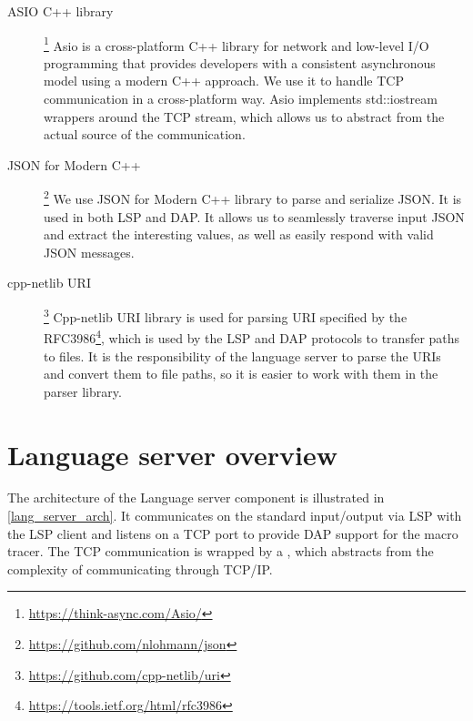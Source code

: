 \begin{description}
	\item [ASIO C++ library]\hspace{-4px}\footnote{\url{https://think-async.com/Asio/}}
Asio is a cross-platform C++ library for network and low-level I/O programming that provides developers with a consistent asynchronous model using a modern C++ approach. We use it to handle TCP communication in a cross-platform way. Asio implements std::iostream wrappers around the TCP stream, which allows us to abstract from the actual source of the communication.

\item [JSON for Modern C++]\hspace{-4px}\footnote{\url{https://github.com/nlohmann/json}} We use JSON for Modern C++ library to parse and serialize JSON. It is used in both LSP and DAP. It allows us to seamlessly traverse input JSON and extract the interesting values, as well as easily respond with valid JSON messages.

\item [cpp-netlib URI]\hspace{-4px}\footnote{\url{https://github.com/cpp-netlib/uri}} Cpp-netlib URI library is used for parsing URI specified by the RFC3986\footnote{\url{https://tools.ietf.org/html/rfc3986}}, which is used by the LSP and DAP protocols to transfer paths to files. It is the responsibility of the language server to parse the URIs and convert them to file paths, so it is easier to work with them in the parser library. 
\end{description}

\section{Language server overview}
The architecture of the Language server component is illustrated in \cref{lang_server_arch}. It communicates on the standard input/output via LSP with the LSP client and listens on a TCP port to provide DAP support for the macro tracer. The TCP communication is wrapped by a , which abstracts from the complexity of communicating through TCP/IP.


